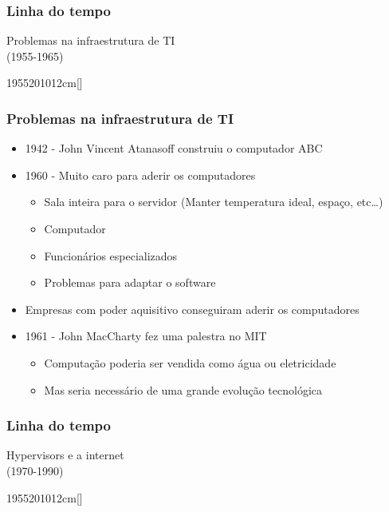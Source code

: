 \begin{frame}
	\frametitle{Linha do tempo}
	\begin{center}
		Problemas na infraestrutura de TI \\ (1955-1965)
	\end{center}
	\hfill
	\begin{scriptsize}
	\begin{bf}
	\begin{center}
		\begin{chronology}[10]{1955}{2010}{12cm}[\textwidth]
			\color{lightgreen}
		\end{chronology}
	\end{center}
	\end{bf}
	\end{scriptsize}
\end{frame}

\begin{frame}[allowframebreaks]
	\frametitle{Problemas na infraestrutura de TI}
	\begin{itemize}
		\item 1942 - John Vincent Atanasoff construiu o computador ABC
		\item 1960 - Muito caro para aderir os computadores
			\begin{itemize}
				\item Sala inteira para o servidor (Manter temperatura ideal, espaço, etc\dots)
				\item Computador
				\item Funcionários especializados
				\item Problemas para adaptar o software
			\end{itemize}
		\framebreak
		\item Empresas com poder aquisitivo conseguiram aderir os computadores
		\item 1961 - John MacCharty fez uma palestra no MIT
			\begin{itemize}
				\item Computação poderia ser vendida como água ou eletricidade \cite{SimsonTCI}
				\item Mas seria necessário de uma grande evolução tecnológica
			\end{itemize}
	\end{itemize}
\end{frame}

\begin{frame}
	\frametitle{Linha do tempo}
	\begin{center}
		Hypervisors e a internet \\
		(1970-1990)
	\end{center}
	\hfill
	\begin{scriptsize}
	\begin{bf}
	\begin{center}
		\begin{chronology}[10]{1955}{2010}{12cm}[\textwidth]
			\color{lightgreen}
				\event[1970]{1990}{1970-1990}
		\end{chronology}
	\end{center}
	\end{bf}
	\end{scriptsize}
\end{frame}

